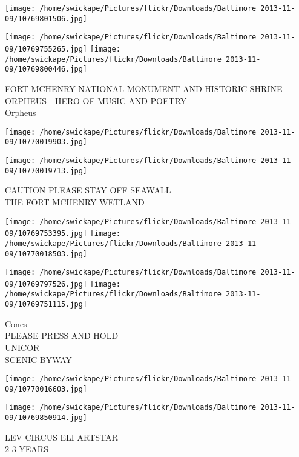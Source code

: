 \documentclass[10pt,letterpaper]{article}
\begin{document}
\texttt{[image: /home/swickape/Pictures/flickr/Downloads/Baltimore 2013-11-09/10769801506.jpg]}

\vspace{0.25in}
\texttt{[image: /home/swickape/Pictures/flickr/Downloads/Baltimore 2013-11-09/10769755265.jpg]}
\texttt{[image: /home/swickape/Pictures/flickr/Downloads/Baltimore 2013-11-09/10769800446.jpg]}

FORT MCHENRY NATIONAL MONUMENT AND HISTORIC SHRINE\\
ORPHEUS {-} HERO OF MUSIC AND POETRY\\
Orpheus\\
\pagebreak

\texttt{[image: /home/swickape/Pictures/flickr/Downloads/Baltimore 2013-11-09/10770019903.jpg]}

\vspace{0.25in}
\texttt{[image: /home/swickape/Pictures/flickr/Downloads/Baltimore 2013-11-09/10770019713.jpg]}

CAUTION PLEASE STAY OFF SEAWALL\\
THE FORT MCHENRY WETLAND\\
\pagebreak

\texttt{[image: /home/swickape/Pictures/flickr/Downloads/Baltimore 2013-11-09/10769753395.jpg]}
\texttt{[image: /home/swickape/Pictures/flickr/Downloads/Baltimore 2013-11-09/10770018503.jpg]}

\texttt{[image: /home/swickape/Pictures/flickr/Downloads/Baltimore 2013-11-09/10769797526.jpg]}
\texttt{[image: /home/swickape/Pictures/flickr/Downloads/Baltimore 2013-11-09/10769751115.jpg]}

Cones\\
PLEASE PRESS AND HOLD\\
UNICOR\\
SCENIC BYWAY\\
\pagebreak

\texttt{[image: /home/swickape/Pictures/flickr/Downloads/Baltimore 2013-11-09/10770016603.jpg]}

\vspace{0.25in}
\texttt{[image: /home/swickape/Pictures/flickr/Downloads/Baltimore 2013-11-09/10769850914.jpg]}

LEV CIRCUS ELI ARTSTAR\\
2{-}3 YEARS\\
\pagebreak
\end{document}
